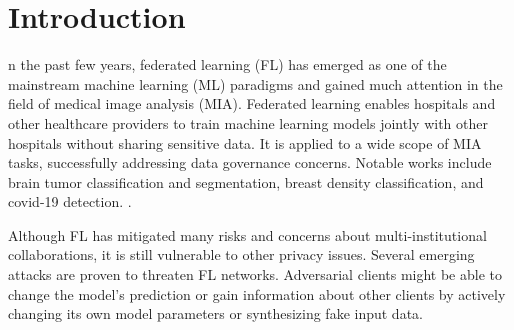 









\section{Introduction}
n the past few years, federated learning (FL) has emerged as one of the mainstream machine learning (ML) paradigms and gained much attention in the field of medical image analysis (MIA). Federated learning enables hospitals and other healthcare providers to train machine learning models jointly with other hospitals without sharing sensitive data. It is applied to a wide scope of MIA tasks, successfully addressing data governance concerns. Notable works include brain tumor classification and segmentation, breast density classification, and covid-19 detection. \cite{sheller2020federated,dayan2021federated,rieke2020future}.



Although FL has mitigated many risks and concerns about multi-institutional collaborations, it is still vulnerable to other privacy issues. Several emerging attacks are proven to threaten FL networks. Adversarial clients might be able to change the model's prediction or gain information about other clients by actively changing its own model parameters or synthesizing fake input data.





